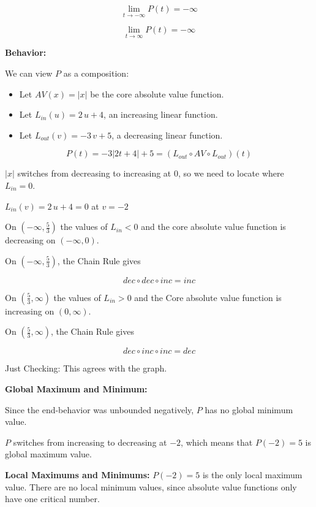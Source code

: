 \documentclass{ximera}
\begin{document}
\begin{example}
\[  \lim\limits_{t \to -\infty} P(t) = -\infty   \]

\[  \lim\limits_{t \to \infty} P(t) = -\infty   \]







\textbf{Behavior:} 

We can view $P$ as a composition:



\begin{itemize}
\item Let $AV(x) = |x|$ be the core absolute value function.
\item Let $L_{in}(u) = 2 \, u + 4$, an increasing linear function.
\item Let $L_{out}(v) = -3 \, v + 5$, a decreasing linear function.
\end{itemize}


\[ P(t) = -3|2t+4|+5 = (L_{out} \circ AV \circ L_{out})(t)\]


$|x|$ switches from decreasing to increasing at $0$, so we need to locate where $L_{in} = 0$.


$L_{in}(v) = 2 \, u + 4 = 0$ at $v = -2$



On $\left( -\infty,  \frac{5}{3} \right)$ the values of $L_{in} < 0$ and the core absolute value function is decreasing on $(-\infty, 0)$. 

On $\left( -\infty,  \frac{5}{3} \right)$, the Chain Rule gives

\[ dec \circ dec \circ inc = inc \]





On $\left( \frac{5}{3}, \infty \right)$ the values of $L_{in} > 0$ and the Core absolute value function is increasing on $(0, \infty)$. 

On $\left( \frac{5}{3}, \infty \right)$, the Chain Rule gives

\[ dec \circ inc \circ inc = dec \]


Just Checking: This agrees with the graph.


\textbf{Global Maximum and Minimum:}

Since the end-behavior was unbounded negatively, $P$ has no global minimum value.

$P$ switches from increasing to decreasing at $-2$, which means that $P(-2) = 5$ is global maximum value.


\textbf{Local Maximums and Minimums:}  $P(-2) = 5$ is the only local maximum value. There are no local minimum values, since absolute value functions only have one critical number.


\end{example}
\end{document}
